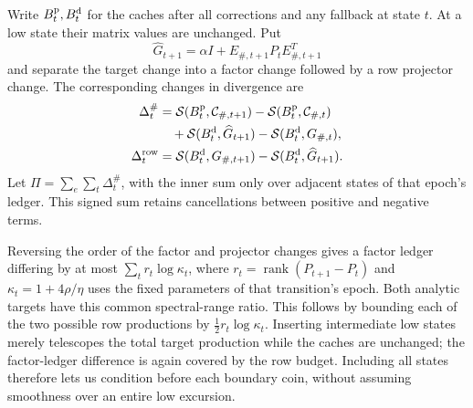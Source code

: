 \documentclass[11pt]{amsart}
\theoremstyle{definition}\newtheorem{definition}[theorem]{Definition}
\theoremstyle{remark}\newtheorem{remark}[theorem]{Remark}
\numberwithin{equation}{section}
\begin{document}
Write $B_t^{\rm p},B_t^{\rm d}$ for the caches after all corrections and
any fallback at state $t$. At a low state their matrix values are
unchanged. Put
\[
 \widehat G_{t+1}=\alpha I+E_{\#,t+1}P_tE_{\#,t+1}^T
\]
and separate the target change into a factor change followed by a row
projector change. The corresponding changes in divergence are
\begin{align}\label{d:production-def}
 \Delta_t^\#
 &=\mathcal S(B_t^{\rm p},\mathcal C_{\#,t+1})
       -\mathcal S(B_t^{\rm p},\mathcal C_{\#,t})\notag\\
 &\quad+\mathcal S(B_t^{\rm d},\widehat G_{t+1})
       -\mathcal S(B_t^{\rm d},G_{\#,t}),\\
 \Delta_t^{\rm row}
 &=\mathcal S(B_t^{\rm d},G_{\#,t+1})
       -\mathcal S(B_t^{\rm d},\widehat G_{t+1}).\notag
\end{align}
Let $\Pi=\sum_e\sum_t\Delta_t^\#$, with the inner sum only over adjacent
states of that epoch's ledger. This signed sum retains cancellations between positive and negative terms.

Reversing the order of the factor and projector changes gives a factor
ledger differing by at most
$\sum_t r_t\log\kappa_t$, where $r_t=\operatorname{rank}(P_{t+1}-P_t)$
and $\kappa_t=1+4\rho/\eta$ uses the fixed parameters of that transition's
epoch. Both analytic targets have this common spectral-range ratio.
This follows by bounding
each of the two possible row productions by
$\tfrac12r_t\log\kappa_t$. Inserting intermediate low states merely
telescopes the total target production while the caches are unchanged;
the factor-ledger difference is again covered by the row budget.
Including all states therefore lets us condition before each boundary
coin, without assuming smoothness over an entire low excursion.
\end{document}
